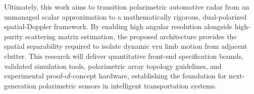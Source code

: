 Ultimately, this work aims to transition polarimetric automotive radar from an unmanaged scalar approximation to a mathematically rigorous, dual-polarized spatial-Doppler framework.
By enabling high angular resolution alongside high-purity scattering matrix estimation, the proposed architecture provides the spatial separability required to isolate dynamic \gls{vru} limb motion from adjacent clutter.
This research will deliver quantitative front-end specification bounds, validated simulation tools, polarimetric array topology guidelines, and experimental proof-of-concept hardware, establishing the foundation for next-generation polarimetric sensors in intelligent transportation systems.